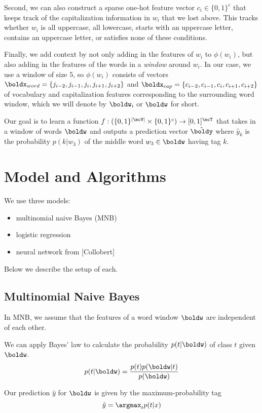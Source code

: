 \documentclass[11pt]{article}
\begin{document}
Second, we can also construct a sparse one-hot feature vector $c_i \in \{0,1\}^c$ that keeps track of the capitalization information in $w_i$ that we lost above. This tracks whether $w_i$ is all uppercase, all lowercase, starts with an uppercase letter, contains an uppercase letter, or satisfies none of these conditions. 

Finally, we add context by not only adding in the features of $w_i$ to $\phi(w_i)$, but also adding in the features of the words in a \emph{window} around $w_i$. In our case, we use a window of size $5$, so $\phi(w_i)$ consists of vectors $\boldx_{word} = \{j_{i-2}, j_{i-1},j_i, j_{i+1}, j_{i+2}\}$ and $\boldx_{cap} = \{c_{i-2}, c_{i-1}, c_i, c_{i+1}, c_{i+2}\}$ of vocabulary and capitalization features corresponding to the surrounding word window, which we will denote by $\boldw_i$ or $\boldw$ for short. 

Our goal is to learn a function $f: (\{0,1\}^{|\mcV|} \times \{0,1\}^c) \to [0,1]^\mcT$ that takes in a window of words $\boldw$ and outputs a prediction vector $\hat{\boldy}$ where $\hat{y}_k$ is the probability $p(k|w_3)$ of the middle word $w_3 \in \boldw$ having tag $k$. 

\section{Model and Algorithms}

We use three models:
\begin{itemize}
  \item multinomial naive Bayes (MNB)
  \item logistic regression
  \item neural network from [Collobert]
\end{itemize}

Below we describe the setup of each.

\subsection{Multinomial Naive Bayes}

In MNB, we assume that the features of a word window $\boldw$ are independent of each other. 

We can apply Bayes' law to calculate the probability $p(t| \boldw)$ of class $t$ given $\boldw$. 
$$p(t| \boldw) = \frac{p(t)p(\boldw |t)}{p(\boldw)}$$

Our prediction $\hat{y}$ for $\boldw$ is given by the maximum-probability tag
$$\hat{y} = \argmax_{t} p(t | x)$$
\end{document}
